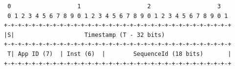 \documentclass[fleqn,10pt,lineno]{wlpeerj}
\begin{document}
\begin{verbatim}
 0                   1                   2                   3
 0 1 2 3 4 5 6 7 8 9 0 1 2 3 4 5 6 7 8 9 0 1 2 3 4 5 6 7 8 9 0 1
+-+-+-+-+-+-+-+-+-+-+-+-+-+-+-+-+-+-+-+-+-+-+-+-+-+-+-+-+-+-+-+-+
|S|                    Timestamp (T - 32 bits)                   
+-+-+-+-+-+-+-+-+-+-+-+-+-+-+-+-+-+-+-+-+-+-+-+-+-+-+-+-+-+-+-+-+
 T| App ID (7)  | Inst (6)  |        SequenceId (18 bits)       |
+-+-+-+-+-+-+-+-+-+-+-+-+-+-+-+-+-+-+-+-+-+-+-+-+-+-+-+-+-+-+-+-+
\end{verbatim}
\end{document}
